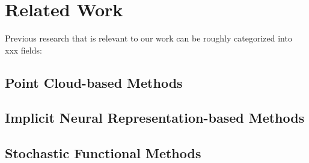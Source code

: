 \chapter{Related Work}\label{ch:related-work}
Previous research that is relevant to our work can be roughly categorized into xxx fields:



\section{Point Cloud-based Methods}



\section{Implicit Neural Representation-based Methods}



\section{Stochastic Functional Methods}



